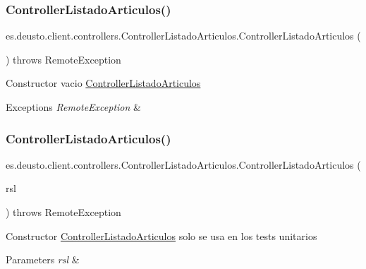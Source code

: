 \subsubsection{\texorpdfstring{ControllerListadoArticulos()}{ControllerListadoArticulos()}\hspace{0.1cm}{\footnotesize\ttfamily [1/2]}}
{\footnotesize\ttfamily es.\+deusto.\+client.\+controllers.\+Controller\+Listado\+Articulos.\+Controller\+Listado\+Articulos (\begin{DoxyParamCaption}{ }\end{DoxyParamCaption}) throws Remote\+Exception}

Constructor vacio \mbox{\hyperlink{classes_1_1deusto_1_1client_1_1controllers_1_1_controller_listado_articulos}{Controller\+Listado\+Articulos}} 
\begin{DoxyExceptions}{Exceptions}
{\em Remote\+Exception} & \\
\hline
\end{DoxyExceptions}
\mbox{\label{classes_1_1deusto_1_1client_1_1controllers_1_1_controller_listado_articulos_a66732a70252ca879d59c9aae471d30dc}} 
\subsubsection{\texorpdfstring{ControllerListadoArticulos()}{ControllerListadoArticulos()}\hspace{0.1cm}{\footnotesize\ttfamily [2/2]}}
{\footnotesize\ttfamily es.\+deusto.\+client.\+controllers.\+Controller\+Listado\+Articulos.\+Controller\+Listado\+Articulos (\begin{DoxyParamCaption}\item[{\mbox{\hyperlink{classes_1_1deusto_1_1client_1_1remote_1_1_service_locator}{Service\+Locator}}}]{rsl }\end{DoxyParamCaption}) throws Remote\+Exception}

Constructor \mbox{\hyperlink{classes_1_1deusto_1_1client_1_1controllers_1_1_controller_listado_articulos}{Controller\+Listado\+Articulos}} solo se usa en los tests unitarios 
\begin{DoxyParams}{Parameters}
{\em rsl} & \\
\hline
\end{DoxyParams}


